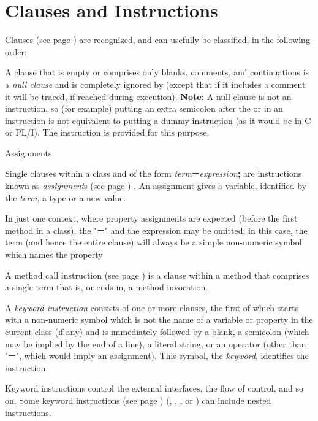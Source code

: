\chapter{Clauses and Instructions}\label{refclause}
  Clauses (see page \pageref{refclau})  are recognized, and can usefully be
classified, in the following order:
\begin{description}
\item[Null clauses]\label{refnullcl}

A clause that is empty or comprises only blanks, comments, and
continuations is a \emph{null clause} and is completely ignored by
\nr{} (except that if it includes a comment it will be traced, if
reached during execution).
\textbf{Note: }A null clause is not an instruction, so (for example) putting an
extra semicolon after the  or  in an
 instruction is not equivalent to putting a dummy instruction
(as it would be in C or PL/I).
The  instruction is provided for this purpose.
\item{Assignments}

Single clauses within a class and of the form
\emph{term}\textbf{=}\emph{expression}\textbf{;} are
instructions known as  \emph{assignment}s (see page \pageref{refassign}) .
An assignment gives a variable, identified by the
\emph{term}, a type or a new value.
 
In just one context, where property assignments are expected (before the
first method in a class), the "\textbf{=}" and the expression may
be omitted; in this case, the term (and hence the entire clause) will
always be a simple non-numeric symbol which names the property
\item[Method call instructions]\label{refxmeth}

A  method call instruction (see page \pageref{refmcalli})  is a clause within a
method that comprises a single term that is, or ends in, a method
invocation.
\item[Keyword instructions]\label{refkwcl}

A \emph{keyword instruction} consists of one or more clauses,
the first of which starts with a non-numeric symbol which is not the
name of a variable or property in the current class (if any) and is
immediately followed by a blank, a semicolon (which may be implied by
the end of a line), a literal string, or an operator (other than
"\textbf{=}", which would imply an assignment).
This symbol, the \emph{keyword}, identifies the instruction.
 
Keyword instructions control the external interfaces, the flow of
control, and so on.
Some  keyword instructions (see page \pageref{refkinst})  (, ,
, or ) can include nested instructions.
\end{description}
